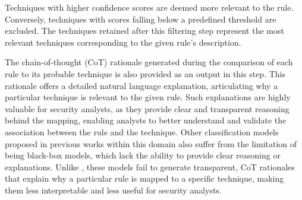 Techniques with higher confidence scores are deemed more relevant to the rule. 
Conversely, techniques with scores falling below a predefined threshold are excluded.
The techniques retained after this filtering step represent the most relevant techniques corresponding to the given rule's description. 


The chain-of-thought (CoT) rationale generated during the comparison of each rule to its probable technique is also provided as an output in this step.
This rationale offers a detailed natural language explanation, articulating why a particular technique is relevant to the given rule. 
Such explanations are highly valuable for security analysts, as they provide clear and transparent reasoning behind the mapping, enabling analysts to better understand and validate the association between the rule and the technique.
Other classification models proposed in previous works within this domain also suffer from the limitation of being black-box models, which lack the ability to provide clear reasoning or explanations. 
Unlike \methodName, these models fail to generate transparent, CoT rationales that explain why a particular rule is mapped to a specific technique, making them less interpretable and less useful for security analysts.